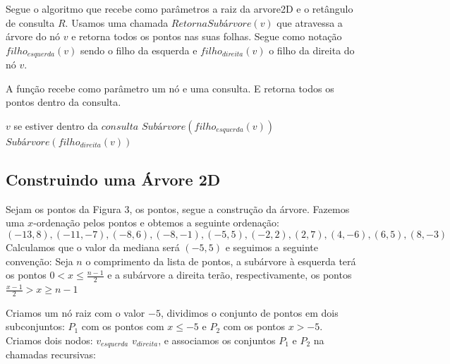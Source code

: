 Segue o algoritmo que recebe como parâmetros a raiz da arvore2D e o retângulo de consulta \(R\).
Usamos uma chamada \(RetornaSubárvore(v)\) que atravessa a árvore do nó \(v\) e retorna
todos os pontos nas suas folhas. Segue como notação \(filho_{esquerda}(v)\) sendo o filho da esquerda e
\(filho_{direita}(v)\) o filho da direita do nó \(v\).


\begin{algorithm}[H]
    \caption{A função  recebe como parâmetro um nó e uma 
    consulta.
     E retorna todos os pontos dentro da consulta.}
    \begin{algorithmic}[1]
        \Return  $v$ se estiver dentro da $consulta$
        \Else
            \State \Return $Subárvore( filho_{esquerda}(v) )$
            \Else
                \State {}
                \EndIf
            \EndIf
            \State \Return $Subárvore(filho_{direita}(v))$
            \Else
                \State {}
                \EndIf
            \EndIf
        \EndIf
    \EndFunction
    \end{algorithmic}
\end{algorithm}

\subsection{Construindo uma Árvore 2D}
Sejam os pontos da Figura 3, os pontos, segue a construção da árvore.
Fazemos uma $x$-ordenação pelos pontos e obtemos a seguinte ordenação:
\[
    (-13,8), (-11,-7), (-8,6), (-8,-1), (-5,5), (-2, 2), (2,7), (4,-6),(6,5),(8,-3)
\]
Calculamos que o valor da mediana será $(-5,5)$ e seguimos a seguinte convenção:
Seja $n$ o comprimento da lista de pontos, a subárvore à esquerda terá os pontos $0 < x \leq 
\frac{n-1}{2}$ e a subárvore a direita terão, respectivamente, os pontos $ \frac{x-1}{2} > x \geq n -1$

Criamos um nó raiz com o valor $-5$, dividimos o conjunto de pontos em dois subconjuntos: $P_1$ 
com os pontos com $x \leq -5$ e $P_2$ com os pontos $x > -5$.
Criamos dois nodos: $v_{esquerda}$ $v_{direita}$, e associamos os conjuntos $P_1$ e $P_2$ na chamadas
recursivas: 

